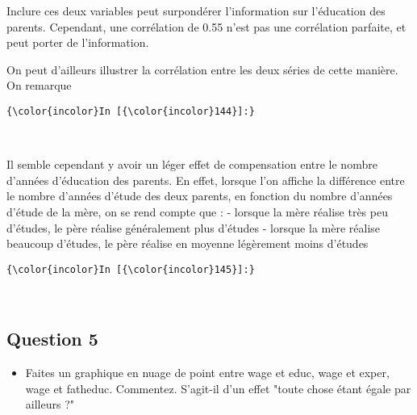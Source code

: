 \documentclass[11pt]{article}
\providecommand{\tightlist}{%
      \setlength{\itemsep}{0pt}\setlength{\parskip}{0pt}}
\begin{document}
Inclure ces deux variables peut surpondérer l'information sur
l'éducation des parents. Cependant, une corrélation de 0.55 n'est pas
une corrélation parfaite, et peut porter de l'information.

    On peut d'ailleurs illustrer la corrélation entre les deux séries de
cette manière. On remarque

    \begin{Verbatim}[commandchars=\\\{\}]
{\color{incolor}In [{\color{incolor}144}]:} 
\end{Verbatim}


    \begin{center}
    \end{center}
    { \hspace*{\fill} \\}
    
    Il semble cependant y avoir un léger effet de compensation entre le
nombre d'années d'éducation des parents. En effet, lorsque l'on affiche
la différence entre le nombre d'années d'étude des deux parents, en
fonction du nombre d'années d'étude de la mère, on se rend compte que :
- lorsque la mère réalise très peu d'études, le père réalise
généralement plus d'études - lorsque la mère réalise beaucoup d'études,
le père réalise en moyenne légèrement moins d'études

    \begin{Verbatim}[commandchars=\\\{\}]
{\color{incolor}In [{\color{incolor}145}]:} 
\end{Verbatim}


    \begin{center}
    \end{center}
    { \hspace*{\fill} \\}
    
    \subsection{Question 5}\label{question-5}

\begin{itemize}
\tightlist
\item
  Faites un graphique en nuage de point entre wage et educ, wage et
  exper, wage et fatheduc. Commentez. S'agit-il d'un effet "toute chose
  étant égale par ailleurs ?"
\end{itemize}
\end{document}
